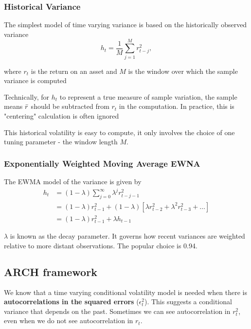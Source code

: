 \documentclass[11pt]{article}
\begin{document}
\subsubsection{Historical Variance}

The simplest model of time varying variance is based on the historically observed variance
\[h_t = \dfrac{1}{M}\sum_{j=1}^M r_{t-j}^2,\]

where $r_t$ is the return on an asset and $M$ is the window over which the sample variance is computed
\begin{note}

Technically, for $h_t$ to represent a true measure of sample variation, the sample means $\Bar{r}$ should be subtracted from $r_t$ in the computation. In practice, this is "centering" calculation is often ignored
\end{note}

This historical volatility is easy to compute, it only involves the choice of one tuning parameter - the window length $M$.

\subsubsection{Exponentially Weighted Moving Average EWNA}

The EWMA model of the variance is given by
\begin{equation}
\begin{aligned}
h_t &= (1-\lambda)\sum_{j=0}^\infty \lambda^j r_{t-j-1}^2 \\
&= (1-\lambda) r_{t-1}^2 + (1-\lambda)\left[\lambda r_{t-2}^2 + \lambda^2 r_{t-3}^2 + \ldots\right] \\
&= (1-\lambda) r_{t-1}^2 + \lambda h_{t-1}
\end{aligned}
\end{equation}


$\lambda$ is known as the decay parameter. It governs how recent variances are weighted relative to more distant observations. The popular choice is 0.94.

\subsection{ARCH framework}

We know that a time varying conditional volatility model is needed when there is \textbf{autocorrelations in the squared errors} ($\epsilon_t^2$). This suggests a conditional variance that depends on the past. Sometimes we can see autocorrelation in $r_t^2$, even when we do not see autocorrelation in $r_t$.
\end{document}
